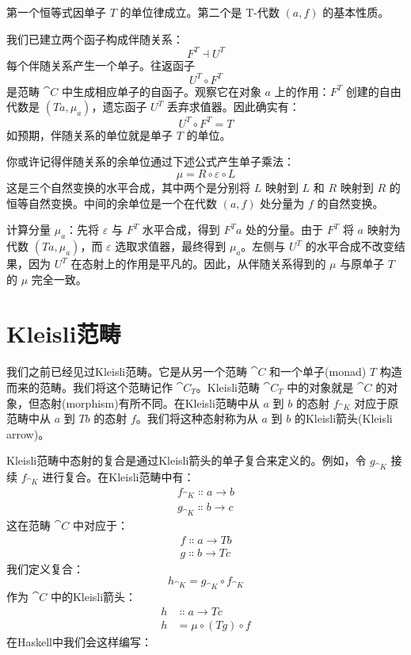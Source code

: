 \noindent
第一个恒等式因单子 $T$ 的单位律成立。第二个是 T-代数 $(a, f)$ 的基本性质。

我们已建立两个函子构成伴随关系：
\[F^T \dashv U^T\]
每个伴随关系产生一个单子。往返函子
\[U^T \circ F^T\]
是范畴 $\cat{C}$ 中生成相应单子的自函子。观察它在对象 $a$ 上的作用：$F^T$ 创建的自由代数是 $(T a, \mu_a)$，遗忘函子 $U^T$ 丢弃求值器。因此确实有：
\[U^T \circ F^T = T\]
如预期，伴随关系的单位就是单子 $T$ 的单位。

你或许记得伴随关系的余单位通过下述公式产生单子乘法：
\[\mu = R \circ \varepsilon \circ L\]
这是三个自然变换的水平合成，其中两个是分别将 $L$ 映射到 $L$ 和 $R$ 映射到 $R$ 的恒等自然变换。中间的余单位是一个在代数 $(a, f)$ 处分量为 $f$ 的自然变换。

计算分量 $\mu_a$：先将 $\varepsilon$ 与 $F^T$ 水平合成，得到 $F^T a$ 处的分量。由于 $F^T$ 将 $a$ 映射为代数 $(T a, \mu_a)$，而 $\varepsilon$ 选取求值器，最终得到 $\mu_a$。左侧与 $U^T$ 的水平合成不改变结果，因为 $U^T$ 在态射上的作用是平凡的。因此，从伴随关系得到的 $\mu$ 与原单子 $T$ 的 $\mu$ 完全一致。

\section{Kleisli范畴}

我们之前已经见过Kleisli范畴。它是从另一个范畴 $\cat{C}$ 和一个单子(monad) $T$ 构造而来的范畴。我们将这个范畴记作 $\cat{C}_T$。Kleisli范畴 $\cat{C}_T$ 中的对象就是 $\cat{C}$ 的对象，但态射(morphism)有所不同。在Kleisli范畴中从 $a$ 到 $b$ 的态射 $f_{\cat{K}}$ 对应于原范畴中从 $a$ 到 $T b$ 的态射 $f$。我们将这种态射称为从 $a$ 到 $b$ 的Kleisli箭头(Kleisli arrow)。

Kleisli范畴中态射的复合是通过Kleisli箭头的单子复合来定义的。例如，令 $g_{\cat{K}}$ 接续 $f_{\cat{K}}$ 进行复合。在Kleisli范畴中有：
\begin{gather*}
  f_{\cat{K}} \Colon a \to b \\
  g_{\cat{K}} \Colon b \to c
\end{gather*}
这在范畴 $\cat{C}$ 中对应于：
\begin{gather*}
  f \Colon a \to T b \\
  g \Colon b \to T c
\end{gather*}
我们定义复合：
$$h_{\cat{K}} = g_{\cat{K}} \circ f_{\cat{K}}$$
作为 $\cat{C}$ 中的Kleisli箭头：
\begin{align*}
  h & \Colon a \to T c          \\
  h & = \mu \circ (T g) \circ f
\end{align*}
在Haskell中我们会这样编写：

